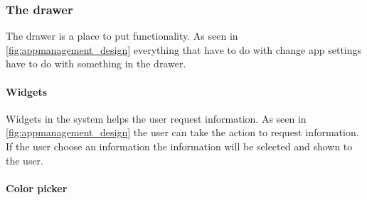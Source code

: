 \subsubsection{The drawer}
\label{sec:drawer}
The drawer is a place to put functionality. As seen in \autoref{fig:appmanagement_design} everything that have to do with change app settings have to do with something in the drawer.
\paragraph{Widgets}
\label{par:widgets}
Widgets in the \giraf[] system helps the user request information. As seen in \autoref{fig:appmanagement_design} the user can take the action to request information. If the user choose an information the information will be selected and shown to the user.

\paragraph{Color picker}
\label{par:colorpicker}
